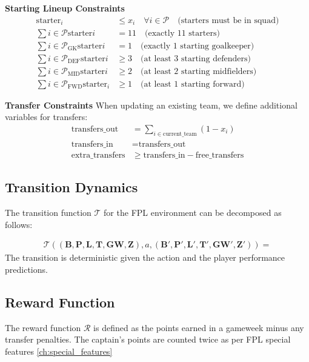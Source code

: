 \textbf{Starting Lineup Constraints}
\begin{align}
    \text{starter}_i &\leq x_i \quad \forall i \in \mathcal{P} \quad \text{(starters must be in squad)} \\
    \sum{i \in \mathcal{P}} \text{starter}i &= 11 \quad \text{(exactly 11 starters)} \\
    \sum{i \in \mathcal{P}_{\text{GK}}} \text{starter}i &= 1 \quad \text{(exactly 1 starting goalkeeper)} \\
    \sum{i \in \mathcal{P}_{\text{DEF}}} \text{starter}i &\geq 3 \quad \text{(at least 3 starting defenders)} \\
    \sum{i \in \mathcal{P}_{\text{MID}}} \text{starter}i &\geq 2 \quad \text{(at least 2 starting midfielders)} \\
    \sum{i \in \mathcal{P}_{\text{FWD}}} \text{starter}_i &\geq 1 \quad \text{(at least 1 starting forward)}
\end{align}

\textbf{Transfer Constraints}
When updating an existing team, we define additional variables for transfers:
\begin{align}
    \text{transfers\_out} &= \sum_{i \in \text{current\_team}} (1 - x_i) \\
    \text{transfers\_in} &= \text{transfers\_out} \\
    \text{extra\_transfers} &\geq \text{transfers\_in} - \text{free\_transfers}
\end{align}

\subsection{Transition Dynamics}

The transition function $\mathcal{T}$ for the FPL environment can be decomposed as follows:

\begin{align}
    \mathcal{T}((\mathbf{B}, \mathbf{P}, \mathbf{L}, \mathbf{T}, \mathbf{GW}, \mathbf{Z}), a, (\mathbf{B}', \mathbf{P}', \mathbf{L}', \mathbf{T}', \mathbf{GW}', \mathbf{Z}')) = 
\end{align}
The transition is deterministic given the action and the player performance predictions.

\subsection{Reward Function}

The reward function $\mathcal{R}$ is defined as the points earned in a gameweek minus any transfer penalties. The captain's points are counted twice as per FPL special features \ref{ch:special_features}


